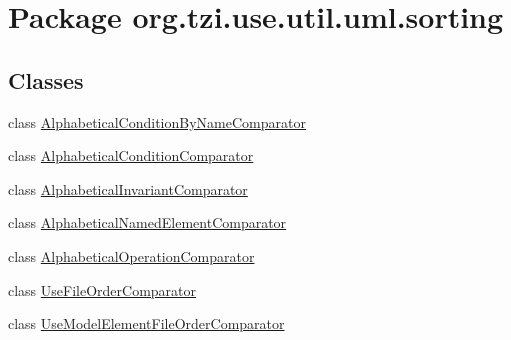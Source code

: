 \hypertarget{namespaceorg_1_1tzi_1_1use_1_1util_1_1uml_1_1sorting}{\section{Package org.\-tzi.\-use.\-util.\-uml.\-sorting}
\label{namespaceorg_1_1tzi_1_1use_1_1util_1_1uml_1_1sorting}
}
\subsection*{Classes}
\begin{DoxyCompactItemize}
\item 
class \hyperlink{classorg_1_1tzi_1_1use_1_1util_1_1uml_1_1sorting_1_1_alphabetical_condition_by_name_comparator}{Alphabetical\-Condition\-By\-Name\-Comparator}
\item 
class \hyperlink{classorg_1_1tzi_1_1use_1_1util_1_1uml_1_1sorting_1_1_alphabetical_condition_comparator}{Alphabetical\-Condition\-Comparator}
\item 
class \hyperlink{classorg_1_1tzi_1_1use_1_1util_1_1uml_1_1sorting_1_1_alphabetical_invariant_comparator}{Alphabetical\-Invariant\-Comparator}
\item 
class \hyperlink{classorg_1_1tzi_1_1use_1_1util_1_1uml_1_1sorting_1_1_alphabetical_named_element_comparator}{Alphabetical\-Named\-Element\-Comparator}
\item 
class \hyperlink{classorg_1_1tzi_1_1use_1_1util_1_1uml_1_1sorting_1_1_alphabetical_operation_comparator}{Alphabetical\-Operation\-Comparator}
\item 
class \hyperlink{classorg_1_1tzi_1_1use_1_1util_1_1uml_1_1sorting_1_1_use_file_order_comparator}{Use\-File\-Order\-Comparator}
\item 
class \hyperlink{classorg_1_1tzi_1_1use_1_1util_1_1uml_1_1sorting_1_1_use_model_element_file_order_comparator}{Use\-Model\-Element\-File\-Order\-Comparator}
\end{DoxyCompactItemize}

